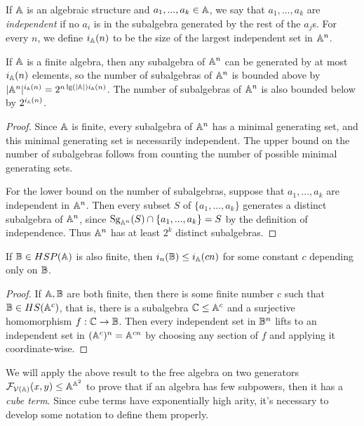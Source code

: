 \documentclass[letterpaper,11pt]{article}
\DeclareMathOperator{\Sg}{Sg}
\begin{document}
\begin{defn} If $\mathbb{A}$ is an algebraic structure and $a_1, ..., a_k \in \mathbb{A}$, we say that $a_1, ..., a_k$ are \emph{independent} if no $a_i$ is in the subalgebra generated by the rest of the $a_j$s. For every $n$, we define $i_{\mathbb{A}}(n)$ to be the size of the largest independent set in $\mathbb{A}^n$.
\end{defn}

\begin{prop} If $\mathbb{A}$ is a finite algebra, then any subalgebra of $\mathbb{A}^n$ can be generated by at most $i_{\mathbb{A}}(n)$ elements, so the number of subalgebras of $\mathbb{A}^n$ is bounded above by $|\mathbb{A}^n|^{i_{\mathbb{A}}(n)} = 2^{n\lg(|\mathbb{A}|)i_{\mathbb{A}}(n)}$. The number of subalgebras of $\mathbb{A}^n$ is also bounded below by $2^{i_{\mathbb{A}}(n)}$.
\end{prop}
\begin{proof} Since $\mathbb{A}$ is finite, every subalgebra of $\mathbb{A}^n$ has a minimal generating set, and this minimal generating set is necessarily independent. The upper bound on the number of subalgebras follows from counting the number of possible minimal generating sets.

For the lower bound on the number of subalgebras, suppose that $a_1, ..., a_k$ are independent in $\mathbb{A}^n$. Then every subset $S$ of $\{a_1, ..., a_k\}$ generates a distinct subalgebra of $\mathbb{A}^n$, since $\Sg_{\bA^n}(S) \cap \{a_1, ..., a_k\} = S$ by the definition of independence. Thus $\mathbb{A}^n$ has at least $2^k$ distinct subalgebras.
\end{proof}

\begin{prop} If $\mathbb{B} \in HSP(\mathbb{A})$ is also finite, then $i_n(\mathbb{B}) \le i_{\mathbb{A}}(cn)$ for some constant $c$ depending only on $\mathbb{B}$.
\end{prop}
\begin{proof} If $\mathbb{A},\mathbb{B}$ are both finite, then there is some finite number $c$ such that $\mathbb{B} \in HS(\mathbb{A}^c)$, that is, there is a subalgebra $\mathbb{C} \le \mathbb{A}^c$ and a surjective homomorphism $f : \mathbb{C} \rightarrow \mathbb{B}$. Then every independent set in $\mathbb{B}^n$ lifts to an independent set in $(\mathbb{A}^c)^n = \mathbb{A}^{cn}$ by choosing any section of $f$ and applying it coordinate-wise.
\end{proof}

We will apply the above result to the free algebra on two generators $\mathcal{F}_{\mathcal{V}(\mathbb{A})}(x,y) \le \mathbb{A}^{\mathbb{A}^2}$ to prove that if an algebra has few subpowers, then it has a \emph{cube term}. Since cube terms have exponentially high arity, it's necessary to develop some notation to define them properly.
\end{document}
